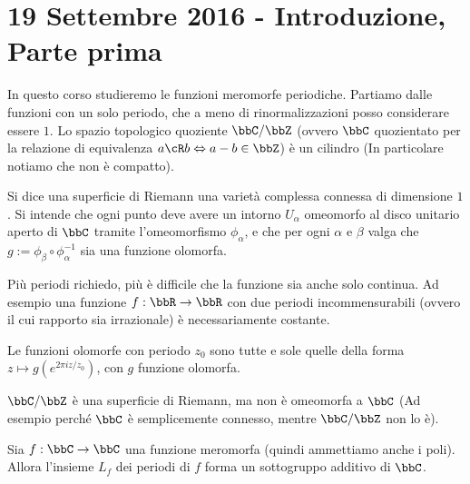 \chapter{19 Settembre 2016 - Introduzione, Parte prima}
\justify

In questo corso studieremo le funzioni meromorfe periodiche.  Partiamo dalle funzioni con un solo periodo, che a meno di rinormalizzazioni posso considerare essere $1$.  Lo spazio topologico quoziente $\bbC / \bbZ$ (ovvero $\bbC$ quozientato per la relazione di equivalenza $a \cR b \sse a-b \in \bbZ$) è un cilindro (In particolare notiamo che non è compatto).

\begin{definizione}
  Si dice una superficie di Riemann una varietà complessa connessa di dimensione $1$.  Si intende che ogni punto deve avere un intorno $U_\alpha$ omeomorfo al disco unitario aperto di $\bbC$ tramite l'omeomorfismo $\phi_\alpha$, e che per ogni $\alpha$ e $\beta$ valga che $g := \phi_\beta \circ \phi_\alpha^{-1}$ sia una funzione olomorfa.
\end{definizione}


\begin{osservazione}
  Più periodi richiedo, più è difficile che la funzione sia anche solo continua. Ad esempio una funzione $f: \bbR \rar \bbR$ con due periodi incommensurabili (ovvero il cui rapporto sia irrazionale) è necessariamente costante.
\end{osservazione}

\begin{esercizio}
  Le funzioni olomorfe con periodo $z_0$ sono tutte e sole quelle della
  forma $z \mapsto g(e^{2\pi i z/z_0})$, con $g$ funzione olomorfa.
\end{esercizio}

\begin{osservazione}
  $\bbC / \bbZ$ è una superficie di Riemann, ma non è omeomorfa a $\bbC$ (Ad esempio perché $\bbC$ è semplicemente connesso, mentre $\bbC / \bbZ$ non lo è).
\end{osservazione}

\begin{lemma}
  Sia $f: \bbC \rar \bbC$ una funzione meromorfa (quindi ammettiamo anche i poli).  Allora l'insieme $L_f$ dei periodi di $f$ forma un sottogruppo additivo di $\bbC$.

\end{lemma}

